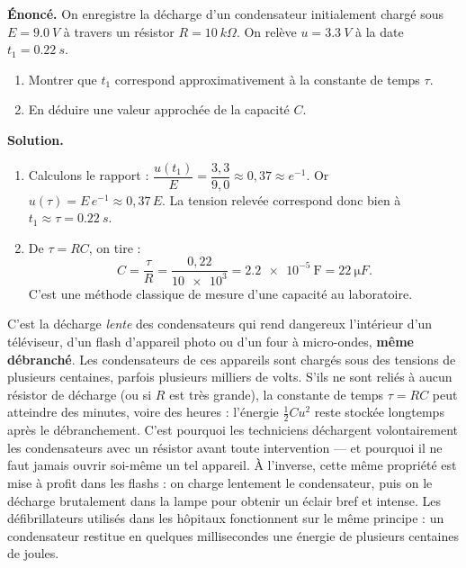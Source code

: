 \documentclass[11pt]{article}
\begin{document}
\begin{exoresolu}
\textbf{Énoncé.} On enregistre la décharge d'un condensateur initialement chargé sous $E = \SI{9,0}{V}$ à travers un résistor $R = \SI{10}{k\Omega}$. On relève $u = \SI{3,3}{V}$ à la date $t_1 = \SI{0,22}{s}$.
\begin{enumerate}
\item Montrer que $t_1$ correspond approximativement à la constante de temps $\tau$.
\item En déduire une valeur approchée de la capacité $C$.
\end{enumerate}
\tcblower
\textbf{Solution.}
\begin{enumerate}
\item Calculons le rapport : $\dfrac{u(t_1)}{E} = \dfrac{3{,}3}{9{,}0} \approx 0{,}37 \approx e^{-1}$. Or $u(\tau) = E\,e^{-1} \approx 0{,}37\,E$. La tension relevée correspond donc bien à $t_1 \approx \tau = \SI{0,22}{s}$.
\item De $\tau = RC$, on tire :
\[ C = \dfrac{\tau}{R} = \dfrac{0{,}22}{\num{10e3}} = \num{2,2e-5}\ \mathrm{F} = \SI{22}{\micro F}. \]
C'est une méthode classique de mesure d'une capacité au laboratoire.
\end{enumerate}
\end{exoresolu}

\begin{savaistu}
C'est la décharge \emph{lente} des condensateurs qui rend dangereux l'intérieur d'un téléviseur, d'un flash d'appareil photo ou d'un four à micro-ondes, \textbf{même débranché}. Les condensateurs de ces appareils sont chargés sous des tensions de plusieurs centaines, parfois plusieurs milliers de volts. S'ils ne sont reliés à aucun résistor de décharge (ou si $R$ est très grande), la constante de temps $\tau = RC$ peut atteindre des minutes, voire des heures : l'énergie $\frac{1}{2}Cu^{2}$ reste stockée longtemps après le débranchement. C'est pourquoi les techniciens déchargent volontairement les condensateurs avec un résistor avant toute intervention — et pourquoi il ne faut jamais ouvrir soi-même un tel appareil. À l'inverse, cette même propriété est mise à profit dans les flashs : on charge lentement le condensateur, puis on le décharge brutalement dans la lampe pour obtenir un éclair bref et intense. Les défibrillateurs utilisés dans les hôpitaux fonctionnent sur le même principe : un condensateur restitue en quelques millisecondes une énergie de plusieurs centaines de joules.
\end{savaistu}
\end{document}
